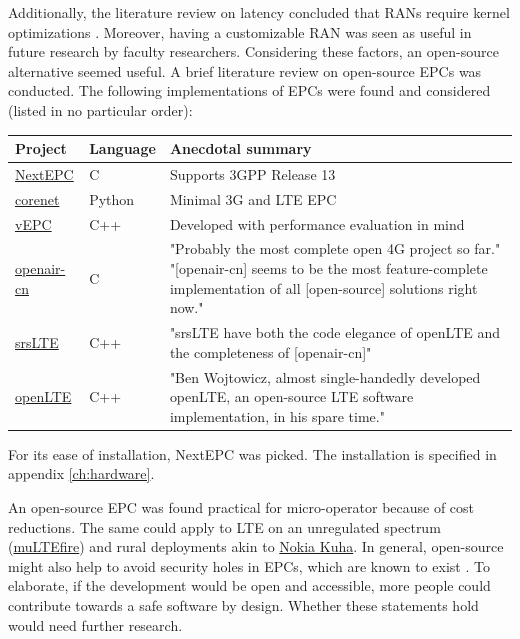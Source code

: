 \documentclass[12pt]{article}
\begin{document}
Additionally, the literature review on latency concluded that \glspl{RAN} require kernel optimizations \cite{mao2015minimizing}. Moreover, having a customizable \gls{RAN} was seen as useful in future research by faculty researchers. Considering these factors, an open-source alternative seemed useful. A brief literature review on open-source \glspl{EPC} was conducted. The following implementations of \glspl{EPC} were found and considered (listed in no particular order):
\begin{center}
    \begin{tabular}{ | l | l | p{10cm} |}
    \hline
    Project & Language & Anecdotal summary \\ \hline
    \href{https://github.com/acetcom/nextepc}{NextEPC} & C & Supports \gls{3GPP} Release 13 \\
    \hline
    \href{https://github.com/mitshell/corenet}{corenet} & Python & Minimal 3G and \gls{LTE} \gls{EPC} \\
    \hline
    \href{https://github.com/networkedsystemsIITB/NFV_LTE_EPC}{vEPC} & C++ & Developed with performance evaluation in mind \cite{jain2016comparison} \\
    \hline
    
    \href{https://gitlab.eurecom.fr/oai/openair-cn}{openair-cn} & C & "Probably the most complete open 4G project so far." \cite{website:spectrum-ieee} "[openair-cn] seems to be the most feature-complete implementation of all [open-source] solutions right now." \cite{website:srslte-mailinglist} \\
    \hline
    
    \href{https://github.com/srsLTE/srsLTE}{srsLTE} & C++ & "srsLTE have both the code elegance of openLTE and the completeness of [openair-cn]" \cite{website:cyberlog} \\
    \hline    
    
    \href{http://openlte.sourceforge.net/}{openLTE} & C++ & "Ben Wojtowicz, almost single-handedly developed openLTE, an open-source \gls{LTE} software implementation, in his spare time." \cite{website:spectrum-ieee} \\
    \hline    
    \end{tabular}
\end{center}

For its ease of installation, NextEPC was picked. The installation is specified in appendix \ref{ch:hardware}.

An open-source \gls{EPC} was found practical for micro-operator because of cost reductions. The same could apply to \gls{LTE} on an unregulated spectrum (\href{https://www.multefire.org/}{muLTEfire}) and rural deployments akin to \href{https://www.kuha.io/}{Nokia Kuha}. In general, open-source might also help to avoid security holes in \glspl{EPC}, which are known to exist \cite{shaik2015practical, rupprechtbreaking}. To elaborate, if the development would be open and accessible, more people could contribute towards a safe software by design. Whether these statements hold would need further research.
\end{document}
